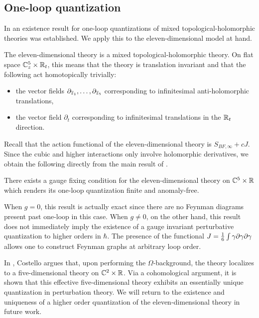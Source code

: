 
\subsection{One-loop quantization}

In \cite{GRWthf} an existence result for one-loop quantizations of mixed topological-holomorphic theories was established. 
We apply this to the eleven-dimensional model at hand. 

The eleven-dimensional theory is a mixed topological-holomorphic theory.
On flat space $\mathbb C^5_z \times \mathbb R_t$, this means that the theory is translation invariant and that the following act homotopically trivially:
\begin{itemize}
\item the vector fields $\partial_{\overline{z}_1}, \ldots, \partial_{\overline{z}_{5}}$ corresponding to infinitesimal anti-holomorphic translations,
\item the vector field $\partial_t$ corresponding to infinitesimal translations in the $\mathbb R_t$ direction. 
\end{itemize}

Recall that the action functional of the eleven-dimensional theory is $S_{BF, \infty} + c J$. 
Since the cubic and higher interactions only involve holomorphic derivatives, we obtain the following directly from the main result of \cite{GRWthf}. 

\begin{thm}
There exists a gauge fixing condition for the eleven-dimensional theory on $\mathbb C^5 \times \mathbb R$ which renders its one-loop quantization finite and anomaly-free. 
\end{thm} 

When $g=0$, this result is actually exact
since there are no Feynman diagrams present past one-loop in this case. 
When $g \ne 0$, on the other hand, this result does not immediately imply the existence of a gauge invariant perturbative quantization to higher orders in $\hbar$. 
The presence of the functional $J = \frac16 \int \gamma \partial \gamma \partial \gamma$ allows one to construct Feynman graphs at arbitrary loop order. 


In \cite{CostelloM5}, Costello argues that, upon performing the $\Omega$-background, the theory localizes to a five-dimensional theory on $\mathbb C^2 \times \mathbb R$. 
Via a cohomological argument, it is shown that this effective five-dimensional theory exhibits an essentially unique quantization in perturbation theory. 
We will return to the existence and uniqueness of a higher order quantization of the eleven-dimensional theory in future work. 
